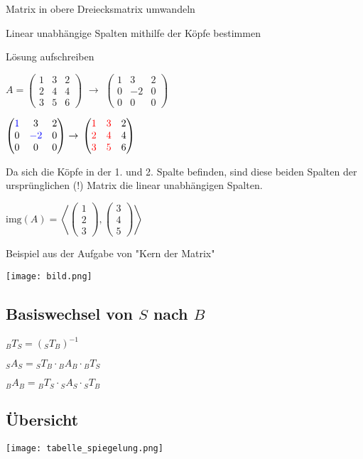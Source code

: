 \begin{multicols*}{3}
    { Matrix in obere Dreiecksmatrix umwandeln}

    { Linear unabhängige Spalten mithilfe der Köpfe bestimmen}

    { Lösung aufschreiben}

    {$A =  \begin{pmatrix} 1 & 3 & 2 \\ 2 & 4 & 4 \\ 3 & 5 & 6 \end{pmatrix}$   {$\to$ $\begin{pmatrix} 1 & 3 & 2 \\ 0 & -2 & 0 \\ 0 & 0 & 0 \end{pmatrix}$}}

    { $\begin{pmatrix} {\color{blue}1} & 3 & 2 \\ 0 & {\color{blue}-2} & 0 \\ 0 & 0 & 0 \end{pmatrix} \rightarrow$   $\begin{pmatrix} {\color{red}1} & {\color{red}3} & 2 \\ {\color{red}2} & {\color{red}4} & 4 \\ {\color{red}3} & {\color{red}5} & 6 \end{pmatrix}$}

    {Da sich die Köpfe in der 1. und 2. Spalte befinden, sind diese beiden Spalten der ursprünglichen (!) Matrix die linear unabhängigen Spalten.}



    { $\text{img}(A) = \left\langle \begin{pmatrix} 1 \\ 2 \\ 3 \end{pmatrix}, \begin{pmatrix} 3 \\ 4 \\ 5 \end{pmatrix} \right\rangle$}

    Beispiel aus der Aufgabe von "Kern der Matrix"

    {\texttt{[image: bild.png]}}

    \subsection{Basiswechsel von $S$ nach $B$}

    ${}_{B}T_{S} = ({}_{S}T_{B})^{-1}$

    ${}_{S}A_{S} = {}_{S}T_{B} \cdot {}_{B}A_{B} \cdot {}_{B}T_{S}$

    ${}_{B}A_{B} = {}_{B}T_{S}  \cdot {}_{S}A_{S} \cdot {}_{S}T_{B}$


    \vfill\null
    \newpage
    \subsection{ Übersicht}
    {\texttt{[image: tabelle\_spiegelung.png]}}

\end{multicols*}





